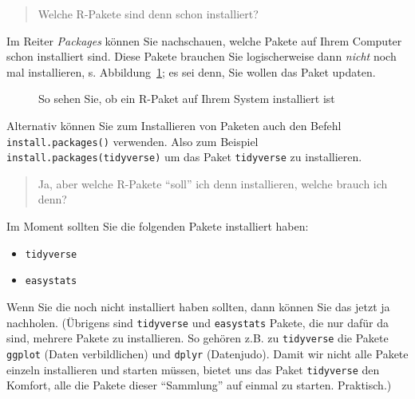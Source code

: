 \documentclass[
  a4paper,
]{scrbook}
\providecommand{\tightlist}{%
  \setlength{\itemsep}{0pt}\setlength{\parskip}{0pt}}\usepackage{longtable,booktabs,array}
\theoremstyle{definition}
\theoremstyle{definition}
\theoremstyle{definition}
\theoremstyle{remark}
\begin{document}
\begin{quote}
{} Welche R-Pakete sind denn schon installiert?
\end{quote}

Im Reiter \emph{Packages} können Sie nachschauen, welche Pakete auf
Ihrem Computer schon installiert sind. Diese Pakete brauchen Sie
logischerweise dann \emph{nicht} noch mal installieren, s.
Abbildung~\ref{fig-paket-installiert}; es sei denn, Sie wollen das Paket
updaten.

\begin{figure}


\caption{\label{fig-paket-installiert}So sehen Sie, ob ein R-Paket auf
Ihrem System installiert ist}

\end{figure}%

Alternativ können Sie zum Installieren von Paketen auch den Befehl
\texttt{install.packages()} verwenden. Also zum Beispiel
\texttt{install.packages(tidyverse)} um das Paket \texttt{tidyverse} zu
installieren.

\begin{quote}
{} Ja, aber welche R-Pakete ``soll'' ich denn
installieren, welche brauch ich denn?
\end{quote}

Im Moment sollten Sie die folgenden Pakete installiert haben:

\begin{itemize}
\tightlist
\item
  \texttt{tidyverse}
\item
  \texttt{easystats}
\end{itemize}

Wenn Sie die noch nicht installiert haben sollten, dann können Sie das
jetzt ja nachholen. (Übrigens sind \texttt{tidyverse} und
\texttt{easystats} Pakete, die nur dafür da sind, mehrere Pakete zu
installieren. So gehören z.B. zu \texttt{tidyverse} die Pakete
\texttt{ggplot} (Daten verbildlichen) und \texttt{dplyr} (Datenjudo).
Damit wir nicht alle Pakete einzeln installieren und starten müssen,
bietet uns das Paket \texttt{tidyverse} den Komfort, alle die Pakete
dieser ``Sammlung'' auf einmal zu starten. Praktisch.)
\end{document}
